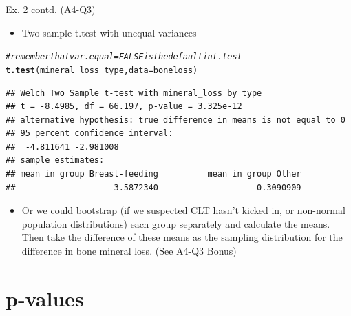 \documentclass[handout]{beamer}\usepackage[]{graphicx}\usepackage[]{color}
\newcommand{\hlcom}[1]{\textcolor[rgb]{0.678,0.584,0.686}{\textit{#1}}}%
\newcommand{\hlopt}[1]{\textcolor[rgb]{0,0,0}{#1}}%
\newcommand{\hlstd}[1]{\textcolor[rgb]{0.345,0.345,0.345}{#1}}%
\newcommand{\hlkwc}[1]{\textcolor[rgb]{0.333,0.667,0.333}{#1}}%
\newcommand{\hlkwd}[1]{\textcolor[rgb]{0.737,0.353,0.396}{\textbf{#1}}}%
\newenvironment{knitrout}{}{} %
\begin{document}
\begin{frame}[fragile]{Ex. 2 contd. (A4-Q3)}
\begin{itemize}
	\small
	\setlength\itemsep{1em}
	\item  Two-sample t.test with unequal variances
\end{itemize}

\begin{knitrout}\tiny
{}\color{fgcolor}
\begin{alltt}
\hlcom{# remember that var.equal=FALSE is the default in t.test }
\hlkwd{t.test}\hlstd{(mineral_loss} \hlopt{~} \hlstd{type,} \hlkwc{data} \hlstd{= boneloss)}
\end{alltt}
\begin{verbatim}
## Welch Two Sample t-test with mineral_loss by type 
## t = -8.4985, df = 66.197, p-value = 3.325e-12
## alternative hypothesis: true difference in means is not equal to 0 
## 95 percent confidence interval:
##  -4.811641 -2.981008 
## sample estimates:
## mean in group Breast-feeding          mean in group Other 
##                   -3.5872340                    0.3090909
\end{verbatim}

\end{knitrout}

\pause 
\begin{itemize}
	\small
	\setlength\itemsep{1em}
	\item  Or we could bootstrap (if we suspected CLT hasn't kicked in, or non-normal population distributions) each group separately and calculate the means. Then take the difference of these means as the sampling distribution for the difference in bone mineral loss. (See A4-Q3 Bonus)
\end{itemize}

\end{frame}


\section{p-values}
\end{document}

